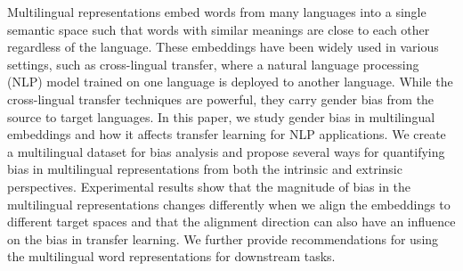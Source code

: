 Multilingual representations embed words from many languages into a single semantic space such that words with similar meanings are close to each other regardless of the language. These embeddings have been widely used in various settings, such as cross-lingual transfer, where a natural language processing (NLP) model trained on one language is deployed to another language. While the cross-lingual transfer techniques are powerful, they carry gender bias from the source to target languages. In this paper, we study gender bias in multilingual embeddings and how it affects transfer learning for NLP applications. We create a multilingual dataset for bias analysis and propose several ways for quantifying bias in multilingual representations from both the intrinsic and extrinsic perspectives. Experimental results show that the magnitude of bias in the multilingual representations changes differently when we align the embeddings to different target spaces and that the alignment direction can also have an influence on the bias in  transfer learning.  We further provide recommendations for using the multilingual word representations for downstream tasks.

